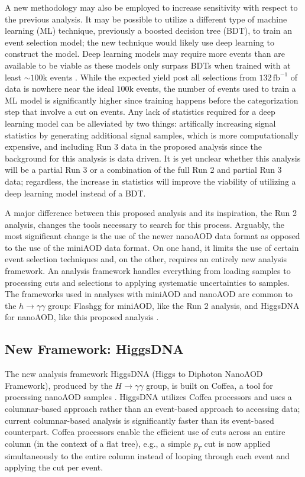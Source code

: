 \documentclass[12pt]{article}
\begin{document}
A new methodology may also be employed to increase sensitivity with respect to the previous analysis. It may be possible to utilize a different type of machine learning (ML) technique, previously a boosted decision tree (BDT), to train an event selection model; the new technique would likely use deep learning to construct the model. Deep learning models may require more events than are available to be viable as these models only surpass BDTs when trained with at least ${\sim} 100\mathrm{k}$ events \cite{DNN_May}. While the expected yield post all selections from $132\, \mathrm{fb}^{-1}$ of data is nowhere near the ideal $100\mathrm{k}$ events, the number of events used to train a ML model is significantly higher since training happens before the categorization step that involve a cut on events. Any lack of statistics required for a deep learning model can be alleviated by two things: artifically increasing signal statistics by generating additional signal samples, which is more computationally expensive, and including Run 3 data in the proposed analysis since the background for this analysis is data driven. It is yet unclear whether this analysis will be a partial Run 3 or a combination of the full Run 2 and partial Run 3 data; regardless, the increase in statistics will improve the viability of utilizing a deep learning model instead of a BDT.\par

A major difference between this proposed analysis and its inspiration, the Run 2 analysis, changes the tools necessary to search for this process. Arguably, the most significant change is the use of the newer nanoAOD data format as opposed to the use of the miniAOD data format. On one hand, it limits the use of certain event selection techniques and, on the other, requires an entirely new analysis framework. An analysis framework handles everything from loading samples to processing cuts and selections to applying systematic uncertainties to samples. The frameworks used in analyses with miniAOD and nanoAOD are common to the $h\rightarrow\gamma\gamma$ group: Flashgg for miniAOD, like the Run 2 analysis, and HiggsDNA for nanoAOD, like this proposed analysis \cite{Flashgg, HiggsDNA}.\par

\subsection{New Framework: HiggsDNA}
The new analysis framework HiggsDNA (Higgs to Diphoton NanoAOD Framework), produced by the $H \rightarrow \gamma\gamma$ group, is built on Coffea, a tool for processing nanoAOD samples \cite{lindsey_gray_2023_8408347}. HiggsDNA utilizes Coffea processors and uses a columnar-based approach rather than an event-based approach to accessing data; current columnar-based analysis is significantly faster than its event-based counterpart. Coffea processors enable the efficient use of cuts across an entire column (in the context of a flat tree), e.g., a simple $p_T$ cut is now applied simultaneously to the entire column instead of looping through each event and applying the cut per event.\par
\end{document}
